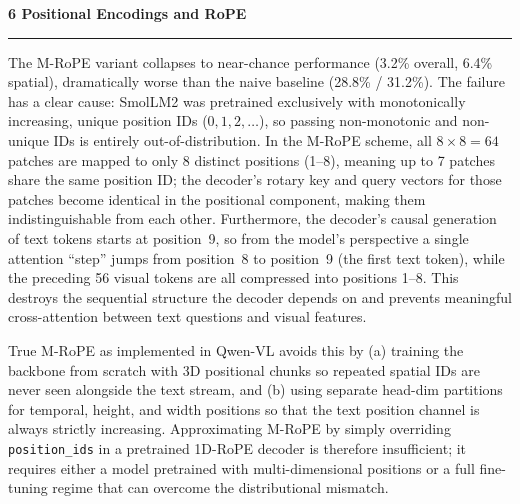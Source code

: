 \documentclass[11pt]{article}
\newenvironment{question}[1]
    {
        \begin{center}
        \textbf{#1} \rmfamily
        \bigskip
        \hrule
    }
    {
        \end{center}
    }
\begin{document}
\begin{question}{6 Positional Encodings and RoPE}
\begin{enumerate}[label=\textbf{\arabic*.}]
    The M-RoPE variant collapses to near-chance performance (3.2\% overall,
    6.4\% spatial), dramatically worse than the naive baseline (28.8\% / 31.2\%).
    The failure has a clear cause: SmolLM2 was pretrained exclusively with
    monotonically increasing, unique position IDs ($0,1,2,\ldots$), so passing
    non-monotonic and non-unique IDs is entirely out-of-distribution.
    In the M-RoPE scheme, all $8\times8=64$ patches are mapped to only 8 distinct
    positions (1--8), meaning up to 7 patches share the same position ID; the
    decoder's rotary key and query vectors for those patches become identical in
    the positional component, making them indistinguishable from each other.
    Furthermore, the decoder's causal generation of text tokens starts at
    position~9, so from the model's perspective a single attention ``step''
    jumps from position~8 to position~9 (the first text token), while the
    preceding 56 visual tokens are all compressed into positions 1--8.
    This destroys the sequential structure the decoder depends on and prevents
    meaningful cross-attention between text questions and visual features.

    True M-RoPE as implemented in Qwen-VL avoids this by (a) training the
    backbone from scratch with 3D positional chunks so repeated spatial IDs
    are never seen alongside the text stream, and (b) using separate head-dim
    partitions for temporal, height, and width positions so that the text
    position channel is always strictly increasing.
    Approximating M-RoPE by simply overriding \texttt{position\_ids} in a
    pretrained 1D-RoPE decoder is therefore insufficient; it requires either
    a model pretrained with multi-dimensional positions or a full
    fine-tuning regime that can overcome the distributional mismatch.

\end{enumerate}
\end{question}
\end{document}
